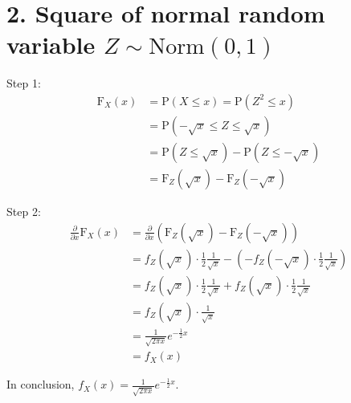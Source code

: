 \documentclass{article}
\begin{document}
\section*{2. Square of normal random variable $Z\sim \text{Norm}(0,1)$}
Step 1:
\begin{align*}
\text{F}_X(x) &= \text{P}(X \leq x) = \text{P}(Z^2 \leq x)\\
&=   \text{P}(-\sqrt{x} \leq Z \leq \sqrt{x})\\
&=  \text{P}(Z \leq \sqrt{x}) - \text{P}(Z \leq -\sqrt{x}) \\
&= \text{F}_Z(\sqrt{x}) - \text{F}_Z(-\sqrt{x})
\end{align*}

Step 2:
\begin{align*}
\frac{\partial}{\partial x}\text{F}_X(x) &= \frac{\partial}{\partial x}\left(\text{F}_Z(\sqrt{x}) - \text{F}_Z(-\sqrt{x})\right)\\
&=f_Z(\sqrt{x}) \cdot \frac{1}{2} \frac{1}{\sqrt{x}} - (- f_Z(-\sqrt{x}) \cdot \frac{1}{2} \frac{1}{\sqrt{x}})\\
&=f_Z(\sqrt{x}) \cdot \frac{1}{2} \frac{1}{\sqrt{x}} + f_Z(\sqrt{x}) \cdot \frac{1}{2} \frac{1}{\sqrt{x}}\\
&= f_Z(\sqrt{x}) \cdot \frac{1}{\sqrt{x}}\\ 
&= \frac{1}{\sqrt{2 \pi x}}e^{-\frac{1}{2}x}\\
&=f_X(x)
\end{align*}

In conclusion, $f_X(x) = \frac{1}{\sqrt{2 \pi x}}e^{-\frac{1}{2}x}$.
\end{document}
